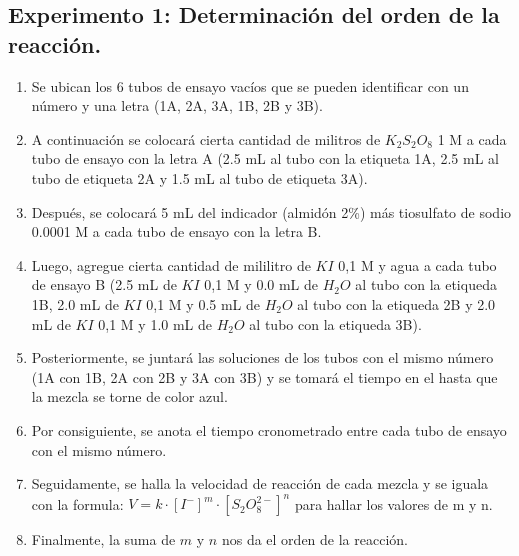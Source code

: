 \documentclass[../main.tex]{subfiles}
\begin{document}
    \subsection{Experimento 1: Determinación del orden de la reacción.}
    \begin{enumerate}
    \item Se ubican los 6 tubos de ensayo vacíos que se pueden identificar con un número y una letra (1A, 2A, 3A, 1B, 2B y 3B).
    \item A continuación se colocará cierta cantidad de militros de $K_2S_2O_8$ 1 M a cada tubo de ensayo con la letra A (2.5 mL al tubo con la etiqueta 1A, 2.5 mL al tubo de etiqueta 2A y 1.5 mL al tubo de etiqueta 3A).
    \item Después, se colocará 5 mL del indicador (almidón 2\%) más tiosulfato de sodio 0.0001 M  a cada tubo de ensayo con la letra B.
    \item Luego, agregue cierta cantidad de mililitro de $KI$ 0,1 M y agua a cada tubo de ensayo B (2.5 mL de $KI$ 0,1 M y 0.0 mL de $H_2O$  al tubo con la etiqueda 1B,  2.0 mL de $KI$ 0,1 M y 0.5 mL de $H_2O$  al tubo con la etiqueda 2B y 2.0 mL de $KI$ 0,1 M y 1.0 mL de $H_2O$  al tubo con la etiqueda 3B).
    \item Posteriormente, se juntará las soluciones de los tubos con el mismo número (1A con 1B, 2A con 2B y 3A con 3B) y se tomará el tiempo en el hasta que la mezcla se torne de color azul.
    \item Por consiguiente, se anota el tiempo cronometrado entre cada tubo de ensayo con el mismo número.
    \item Seguidamente, se halla la velocidad de reacción de cada mezcla y se iguala con la formula: $V=k\cdot[I^{-}]^m\cdot[S_2O_8^{2-}]^n$ para hallar los valores de m y n.
    \item Finalmente, la suma de $m$ y $n$ nos da el orden de la reacción.\cite{lab}
    \end{enumerate}
\end{document}
